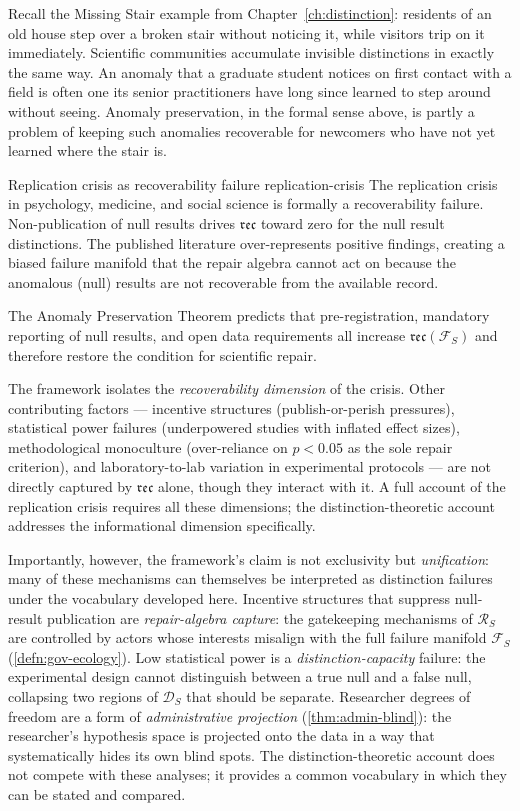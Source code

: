 \documentclass[12pt,twoside,openright]{book}
\newcommand{\reco}{\mathfrak{rec}}
\begin{document}
Recall the Missing Stair example from
Chapter~\ref{ch:distinction}: residents of an old house step
over a broken stair without noticing it, while visitors trip
on it immediately. Scientific communities accumulate
invisible distinctions in exactly the same way. An anomaly
that a graduate student notices on first contact with a field
is often one its senior practitioners have long since learned
to step around without seeing. Anomaly preservation, in the
formal sense above, is partly a problem of keeping such
anomalies recoverable for newcomers who have not yet learned
where the stair is.

\begin{remark}{Replication crisis as recoverability failure}%
  {replication-crisis}
  The replication crisis in psychology, medicine, and
  social science is formally a recoverability failure.
  Non-publication of null results drives $\reco$
  toward zero for the null result distinctions. The
  published literature over-represents positive
  findings, creating a biased failure manifold that
  the repair algebra cannot act on because the
  anomalous (null) results are not recoverable from
  the available record.

  The Anomaly Preservation Theorem predicts that
  pre-registration, mandatory reporting of null results,
  and open data requirements all increase
  $\reco(\mathcal{F}_S)$ and therefore restore the
  condition for scientific repair.

  The framework isolates the \emph{recoverability
  dimension} of the crisis. Other contributing factors
  --- incentive structures (publish-or-perish pressures),
  statistical power failures (underpowered studies with
  inflated effect sizes), methodological monoculture
  (over-reliance on $p < 0.05$ as the sole repair
  criterion), and laboratory-to-lab variation in
  experimental protocols --- are not directly captured
  by $\reco$ alone, though they interact with it.
  A full account of the replication crisis requires
  all these dimensions; the distinction-theoretic
  account addresses the informational dimension specifically.

  Importantly, however, the framework's claim is not
  exclusivity but \emph{unification}: many of these
  mechanisms can themselves be interpreted as distinction
  failures under the vocabulary developed here. Incentive
  structures that suppress null-result publication are
  \emph{repair-algebra capture}: the gatekeeping
  mechanisms of $\mathcal{R}_S$ are controlled by actors
  whose interests misalign with the full failure manifold
  $\mathcal{F}_S$ (\cref{defn:gov-ecology}). Low
  statistical power is a \emph{distinction-capacity}
  failure: the experimental design cannot distinguish
  between a true null and a false null, collapsing two
  regions of $\mathcal{D}_S$ that should be separate.
  Researcher degrees of freedom are a form of
  \emph{administrative projection}
  (\cref{thm:admin-blind}): the researcher's hypothesis
  space is projected onto the data in a way that
  systematically hides its own blind spots. The
  distinction-theoretic account does not compete with
  these analyses; it provides a common vocabulary in
  which they can be stated and compared.
\end{remark}
\end{document}
